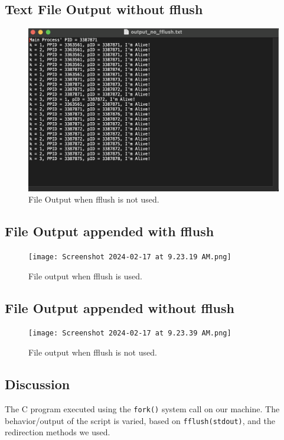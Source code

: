\documentclass[12pt]{article}
\begin{document}
  \subsection{Text File Output without fflush}
  \begin{figure}[h]
    \centering
    \includegraphics[width=17cm]{output_no_fflush.png}
    \caption{File Output when fflush is not used.}
  \end{figure}

\newpage
\subsection{File Output appended with fflush}
\begin{figure}[h]
\centering
\texttt{[image: Screenshot 2024-02-17 at 9.23.19 AM.png]}
\caption{File output when fflush is used.}
\end{figure}

\newpage
\subsection{File Output appended without fflush}
\begin{figure}[h]
\centering
\texttt{[image: Screenshot 2024-02-17 at 9.23.39 AM.png]}
\caption{File output when fflush is not used.}
\end{figure}

\newpage
  \subsection{Discussion}
The C program executed using the \texttt{fork()} system call on our machine. The behavior/output of the script is varied, based on \texttt{fflush(stdout)}, and the redirection methods we used. 
\end{document}
